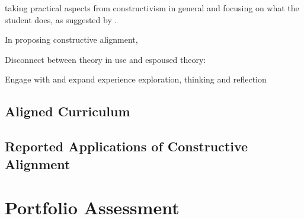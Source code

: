  taking practical aspects from constructivism in general and focusing on what the student does, as suggested by .


In proposing constructive alignment, 

Disconnect between theory in use and espoused theory: \cite{Phillips:2005}


Engage with and expand experience \cite{Dewey:1960} exploration, thinking and reflection


\subsection{Aligned Curriculum} %
\label{sub:aligned_curriculum}


\subsection{Reported Applications of Constructive Alignment} %
\label{sub:reported_applications_of_constructive_alignment}



\section{Portfolio Assessment} %
\label{sec:portfolio_assessment}





